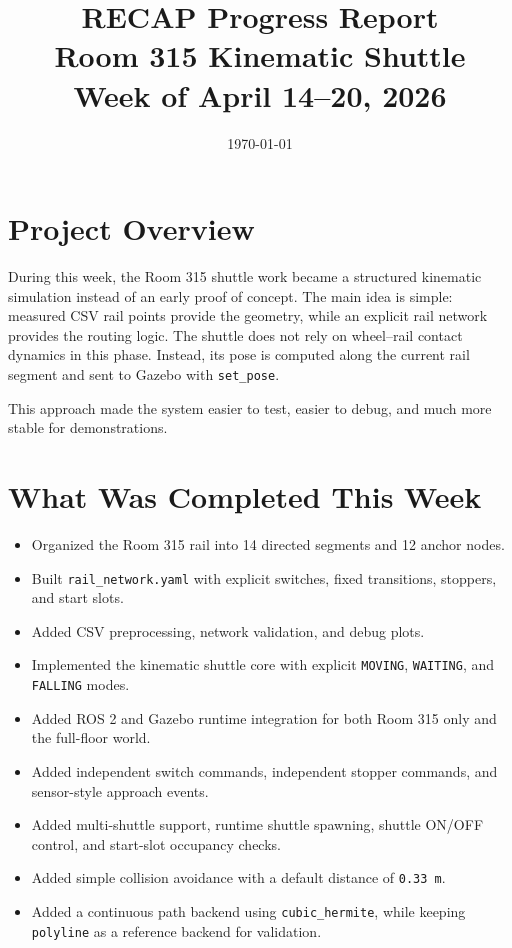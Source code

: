 \documentclass[11pt,a4paper]{article}
\title{RECAP Progress Report\\Room 315 Kinematic Shuttle\\Week of April 14--20, 2026}
\author{}
\date{\today}
\begin{document}
\maketitle

\section*{Project Overview}

During this week, the Room 315 shuttle work became a structured kinematic
simulation instead of an early proof of concept. The main idea is simple:
measured CSV rail points provide the geometry, while an explicit rail network
provides the routing logic. The shuttle does not rely on wheel--rail contact
dynamics in this phase. Instead, its pose is computed along the current rail
segment and sent to Gazebo with \texttt{set\_pose}.

This approach made the system easier to test, easier to debug, and much more
stable for demonstrations.

\section*{What Was Completed This Week}

\begin{itemize}
\item Organized the Room 315 rail into 14 directed segments and 12 anchor
nodes.
\item Built \texttt{rail\_network.yaml} with explicit switches, fixed
transitions, stoppers, and start slots.
\item Added CSV preprocessing, network validation, and debug plots.
\item Implemented the kinematic shuttle core with explicit
\texttt{MOVING}, \texttt{WAITING}, and \texttt{FALLING} modes.
\item Added ROS 2 and Gazebo runtime integration for both Room 315 only and the
full-floor world.
\item Added independent switch commands, independent stopper commands, and
sensor-style approach events.
\item Added multi-shuttle support, runtime shuttle spawning, shuttle ON/OFF
control, and start-slot occupancy checks.
\item Added simple collision avoidance with a default distance of
\texttt{0.33 m}.
\item Added a continuous path backend using \texttt{cubic\_hermite}, while
keeping \texttt{polyline} as a reference backend for validation.
\end{itemize}
\end{document}
